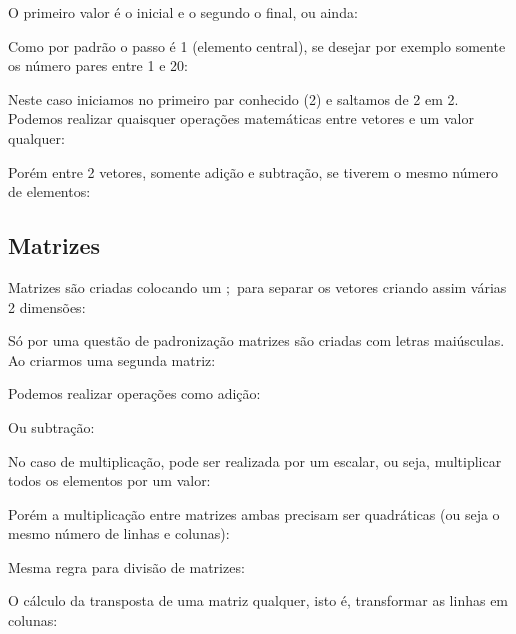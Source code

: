 \documentclass[a4paper,11pt]{article}
\begin{document}
O primeiro valor é o inicial e o segundo o final, ou ainda: \\

Como por padrão o passo é 1 (elemento central), se desejar por exemplo somente os número pares entre 1 e 20: \\

Neste caso iniciamos no primeiro par conhecido (2) e saltamos de 2 em 2. Podemos realizar quaisquer operações matemáticas entre vetores e um valor qualquer: \\

Porém entre 2 vetores, somente adição e subtração, se tiverem o mesmo número de elementos: \\

\subsection{Matrizes}
Matrizes são criadas colocando um $;$ para separar os vetores criando assim várias 2 dimensões: \\

Só por uma questão de padronização matrizes são criadas com letras maiúsculas. Ao criarmos uma segunda matriz: \\

Podemos realizar operações como adição: \\

Ou subtração: \\

No caso de multiplicação, pode ser realizada por um escalar, ou seja, multiplicar todos os elementos por um valor: \\

Porém a multiplicação entre matrizes ambas precisam ser quadráticas (ou seja o mesmo número de linhas e colunas): \\

Mesma regra para divisão de matrizes: \\

O cálculo da transposta de uma matriz qualquer, isto é, transformar as linhas em colunas: \\
\end{document}
